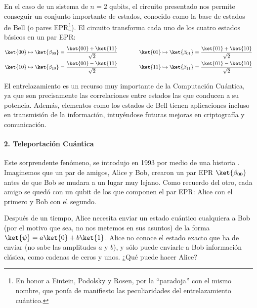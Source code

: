 \documentclass[11pt,a4paper,twoside,pdf]{article}
\numberwithin{equation}{section}
\begin{document}
			En el caso de un sistema de $n=2$ qubits, el circuito presentado nos permite conseguir un conjunto importante de estados, conocido como la base de estados de Bell (o pares EPR\footnote{En honor a Eintein, Podolsky y Rosen, por la ``paradoja'' con el mismo nombre, que ponía de manifiesto las peculiaridades del entrelazamiento cuántico.}). El circuito transforma cada uno de los cuatro estados básicos en un par EPR:
				\begin{equation} \label{eq: Bell}
					\begin{aligned}\ket{00} \mapsto \ket{\beta_{00}} = \frac{\ket{00}+\ket{11}}{\sqrt{2}} 
						\\ \ket{10} \mapsto \ket{\beta_{10}} = \frac{\ket{00}-\ket{11}}{\sqrt{2}}     \end{aligned}	\qquad \qquad
					\begin{aligned}\ket{01} \mapsto \ket{\beta_{01}} = \frac{\ket{01}+\ket{10}}{\sqrt{2}} 
						\\ \ket{11} \mapsto \ket{\beta_{11}} = \frac{\ket{01}-\ket{10}}{\sqrt{2}}     \end{aligned}
				\end{equation}
			
			El entrelazamiento es un recurso muy importante de la Computación Cuántica, ya que son precisamente las correlaciones entre estados las que conducen a su potencia. Además, elementos como los estados de Bell tienen aplicaciones incluso en transmisión de la información, intuyéndose futuras mejoras en criptografía y comunicación.
				
				
			\paragraph{2. Teleportación Cuántica} \hspace{1pt}
			
			Este sorprendente fenómeno, se introdujo en 1993 por medio de una historia \cite{Teleportacion}. Imaginemos que un par de amigos, Alice y Bob, crearon un par EPR $\ket{\beta_{00}}$ antes de que Bob se mudara a un lugar muy lejano. Como recuerdo del otro, cada amigo se quedó con un qubit de los que componen el par EPR: Alice con el primero y Bob con el segundo.
			
			Después de un tiempo, Alice necesita enviar un estado cuántico cualquiera a Bob (por el motivo que sea, no nos metemos en sus asuntos) de la forma $\ket{\psi}=a\ket{0}+b\ket{1}$. Alice no conoce el estado exacto que ha de enviar (no sabe las amplitudes $a$ y $b$), y sólo puede enviarle a Bob información clásica, como cadenas de ceros y unos. ¿Qué puede hacer Alice?
			
\end{document}
